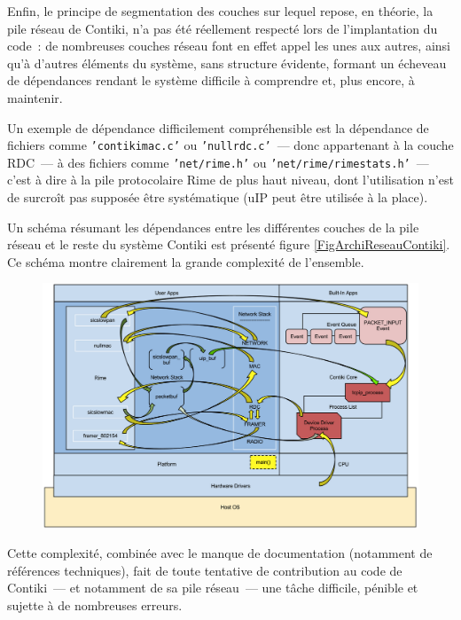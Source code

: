 Enfin, le principe de segmentation des couches sur lequel repose, en
théorie, la pile réseau de Contiki, n'a pas été réellement respecté
lors de l'implantation du code~: de nombreuses couches réseau font en
effet appel les unes aux autres, ainsi qu'à d'autres éléments du système,
sans structure évidente, formant un écheveau de dépendances rendant
le système difficile à comprendre et, plus encore, à maintenir.

Un exemple de dépendance difficilement compréhensible est la dépendance
de fichiers comme \texttt{'contikimac.c'} ou \texttt{'nullrdc.c'}~--- donc
appartenant à la couche RDC~--- à des fichiers comme \texttt{'net/rime.h'}
ou \texttt{'net/rime/rimestats.h'}~--- c'est à dire à la pile protocolaire
Rime de plus haut niveau, dont l'utilisation n'est de surcroît pas
supposée être systématique (uIP peut être utilisée à la place).

Un schéma résumant les dépendances entre les différentes couches de
la pile réseau et le reste du système Contiki est présenté figure
\vref{FigArchiReseauContiki}.
Ce schéma montre clairement la grande complexité de l'ensemble.

\begin{figure}[!hbt]
\centering
\includegraphics[width=12.5cm]{images/ch4-contiki-netstack.png}
\label{FigArchiReseauContiki}
\end{figure}

Cette complexité, combinée avec le manque de documentation (notamment
de références techniques), fait de toute tentative de contribution au code
de Contiki~--- et notamment de sa pile réseau~--- une tâche difficile,
pénible et sujette à de nombreuses erreurs.

